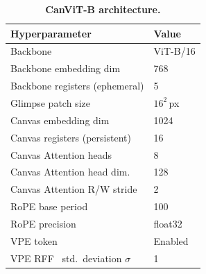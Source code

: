 \documentclass{article}
\begin{document}
\begin{table}[h]
  \caption{\textbf{CanViT-B architecture.}}
  \label{tab:pretrain-arch-hparams}
  \centering
  \begin{tabular}{ll}
    \toprule
    \textbf{Hyperparameter} & \textbf{Value} \\
    \midrule
    Backbone & ViT-B/16 \\
    Backbone embedding dim & 768 \\
    Backbone registers (ephemeral) & 5 \\
    Glimpse patch size & $16^2$\,px \\
    Canvas embedding dim & 1024 \\
    Canvas registers (persistent) & 16 \\
    Canvas Attention heads & 8 \\
    Canvas Attention head dim. & 128 \\
    Canvas Attention R/W stride & 2 \\
    RoPE base period & 100 \\
    RoPE precision & float32 \\
    VPE token & Enabled \\
    VPE \ac{RFF}~\cite{tancikFourierFeaturesLet2020} std.\ deviation $\sigma$ & 1 \\
    \bottomrule
  \end{tabular}
\end{table}
\end{document}
